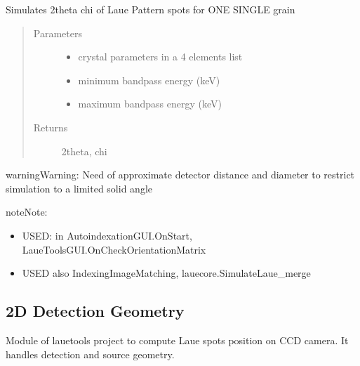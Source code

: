 \documentclass[letterpaper,10pt,english]{sphinxmanual}
\begin{document}
\begin{fulllineitems}
Simulates 2theta chi of Laue Pattern spots for ONE SINGLE grain
\begin{quote}\begin{description}
\item[{Parameters}] \leavevmode\begin{itemize}
\item {} 
 \textendash{} crystal parameters in a 4 elements list

\item {} 
 \textendash{} minimum bandpass energy (keV)

\item {} 
 \textendash{} maximum bandpass energy (keV)

\end{itemize}

\item[{Returns}] \leavevmode
2theta, chi

\end{description}\end{quote}

\begin{sphinxadmonition}{warning}{Warning:}
Need of approximate detector distance and diameter to restrict simulation to a limited solid angle
\end{sphinxadmonition}

\begin{sphinxadmonition}{note}{Note:}\begin{itemize}
\item {} 
USED: in AutoindexationGUI.OnStart, LaueToolsGUI.OnCheckOrientationMatrix

\item {} 
USED also IndexingImageMatching, lauecore.SimulateLaue\_merge

\end{itemize}
\end{sphinxadmonition}

\end{fulllineitems}



\subsection{2D Detection Geometry}
\label{\detokenize{Simulation_Module:module-LaueTools.LaueGeometry}}\label{\detokenize{Simulation_Module:d-detection-geometry}}
Module of lauetools project to compute Laue spots position on CCD camera.
It handles detection and source geometry.
\end{document}
